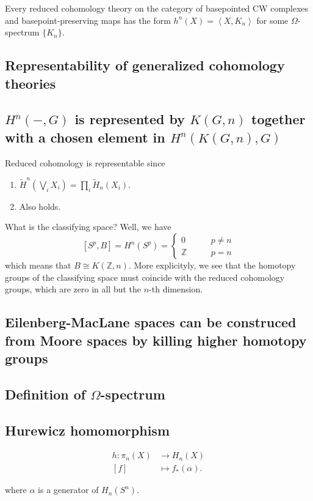 \begin{thm}[4E.1]
	Every reduced cohomology theory on the category of basepointed CW complexes and basepoint-preserving maps has the form $h^{n} (X)=\left<X,K_{n} \right> $ for some $\Omega$-spectrum $\{K_{n}\} $.
\end{thm}


\subsection*{Representability of generalized cohomology theories}

\subsection{$H^{n}(-,G)$ is represented by  $K(G,n)$ together with a chosen element in $H^{n}(K(G,n),G)$}

Reduced cohomology is representable since

\begin{enumerate}[label=(\roman*)]
	\item $\widetilde{H}^{n}(\bigvee_{i}X_{i})=\prod_{i} \widetilde{H}_{n}(X_{i})$.
	\item Also holds. 
\end{enumerate}

What is the classifying space? Well, we have
\[[S^{p},B]=H^{n}(S^{p})=\begin{cases}
	0\qquad &p\neq n\\
	\mathbb{Z}\qquad &p=n
\end{cases}\]
which means that $B\cong K(\mathbb{Z},n)$. More explicityly, we see that the homotopy groups of the classifying space must coincide with the reduced cohomology groups, which are zero in all but the $n$-th dimension.

\subsection*{Eilenberg-MacLane spaces can be construced from Moore spaces by killing higher homotopy groups}
\subsection*{Definition of $\Omega$-spectrum}


\subsection{Hurewicz homomorphism}
\begin{defn}
	\begin{align*}
		h: \pi_{n}(X) &\longrightarrow H_{n}(X) \\
		[f] &\longmapsto f_{*}(\alpha)
	.\end{align*}
\end{defn}
where $\alpha$ is a generator of $ H_{n}(S^{n})$.

